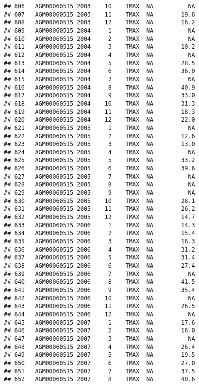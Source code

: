 \documentclass{article}\usepackage[]{graphicx}\usepackage[]{color}
\makeatletter
\newenvironment{kframe}{%
 \def\at@end@of@kframe{}%
 \ifinner\ifhmode%
  \def\at@end@of@kframe{\end{minipage}}%
  \begin{minipage}{\columnwidth}%
 \fi\fi%
 \def\FrameCommand##1{\hskip\@totalleftmargin \hskip-\fboxsep
 \colorbox{shadecolor}{##1}\hskip-\fboxsep
     \hskip-\linewidth \hskip-\@totalleftmargin \hskip\columnwidth}%
 \MakeFramed {\advance\hsize-\width
   \@totalleftmargin\z@ \linewidth\hsize
   \@setminipage}}%
 {\par\unskip\endMakeFramed%
 \at@end@of@kframe}
\newenvironment{knitrout}{}{} %
\makeatother
\begin{document}
\begin{knitrout}
\begin{kframe}
\begin{verbatim}
## 606   AGM00060515 2003    10    TMAX  NA          NA
## 607   AGM00060515 2003    11    TMAX  NA        19.6
## 608   AGM00060515 2003    12    TMAX  NA        16.2
## 609   AGM00060515 2004     1    TMAX  NA          NA
## 610   AGM00060515 2004     2    TMAX  NA          NA
## 611   AGM00060515 2004     3    TMAX  NA        10.2
## 612   AGM00060515 2004     4    TMAX  NA          NA
## 613   AGM00060515 2004     5    TMAX  NA        28.5
## 614   AGM00060515 2004     6    TMAX  NA        36.0
## 615   AGM00060515 2004     7    TMAX  NA          NA
## 616   AGM00060515 2004     8    TMAX  NA        40.9
## 617   AGM00060515 2004     9    TMAX  NA        33.0
## 618   AGM00060515 2004    10    TMAX  NA        31.3
## 619   AGM00060515 2004    11    TMAX  NA        18.3
## 620   AGM00060515 2004    12    TMAX  NA        22.0
## 621   AGM00060515 2005     1    TMAX  NA          NA
## 622   AGM00060515 2005     2    TMAX  NA        12.6
## 623   AGM00060515 2005     3    TMAX  NA        13.0
## 624   AGM00060515 2005     4    TMAX  NA          NA
## 625   AGM00060515 2005     5    TMAX  NA        33.2
## 626   AGM00060515 2005     6    TMAX  NA        39.6
## 627   AGM00060515 2005     7    TMAX  NA          NA
## 628   AGM00060515 2005     8    TMAX  NA          NA
## 629   AGM00060515 2005     9    TMAX  NA          NA
## 630   AGM00060515 2005    10    TMAX  NA        28.1
## 631   AGM00060515 2005    11    TMAX  NA        26.2
## 632   AGM00060515 2005    12    TMAX  NA        14.7
## 633   AGM00060515 2006     1    TMAX  NA        14.3
## 634   AGM00060515 2006     2    TMAX  NA        15.4
## 635   AGM00060515 2006     3    TMAX  NA        16.3
## 636   AGM00060515 2006     4    TMAX  NA        31.2
## 637   AGM00060515 2006     5    TMAX  NA        31.4
## 638   AGM00060515 2006     6    TMAX  NA        27.4
## 639   AGM00060515 2006     7    TMAX  NA          NA
## 640   AGM00060515 2006     8    TMAX  NA        41.5
## 641   AGM00060515 2006     9    TMAX  NA        35.4
## 642   AGM00060515 2006    10    TMAX  NA          NA
## 643   AGM00060515 2006    11    TMAX  NA        26.5
## 644   AGM00060515 2006    12    TMAX  NA          NA
## 645   AGM00060515 2007     1    TMAX  NA        17.6
## 646   AGM00060515 2007     2    TMAX  NA        16.0
## 647   AGM00060515 2007     3    TMAX  NA          NA
## 648   AGM00060515 2007     4    TMAX  NA        26.4
## 649   AGM00060515 2007     5    TMAX  NA        19.5
## 650   AGM00060515 2007     6    TMAX  NA        27.0
## 651   AGM00060515 2007     7    TMAX  NA        37.5
## 652   AGM00060515 2007     8    TMAX  NA        40.6

\end{verbatim}
\end{kframe}
\end{knitrout}
\end{document}
